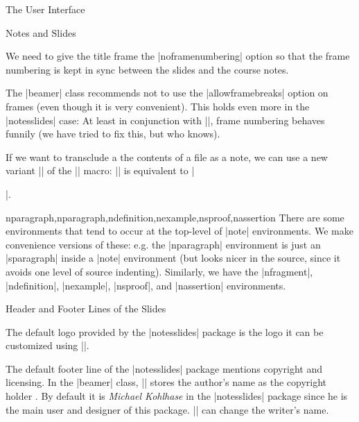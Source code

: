 \begin{sfragment}[id=sec:user]{The User Interface}
\begin{sfragment}[id=sec:user:notesslides]{Notes and Slides}
\begin{dangerbox}
  We need to give the title frame the |noframenumbering| option so that the frame
  numbering is kept in sync between the slides and the course notes.
\end{dangerbox}

\begin{dangerbox}
  The |beamer| class recommends not to use the |allowframebreaks| option on frames (even
  though it is very convenient). This holds even more in the |notesslides| case: At least
  in conjunction with |\newpage|, frame numbering behaves funnily (we have tried to fix
  this, but who knows).
\end{dangerbox}

\begin{function}{}
  If we want to transclude a the contents of a file as a note, we can use a new variant
  || of the || macro: || is equivalent to
  |\begin{note}\end{note}|.
\end{function}

\begin{environment}{nparagraph,nparagraph,ndefinition,nexample,nsproof,nassertion}
  There are some environments that tend to occur at the top-level of |note|
  environments. We make convenience versions of these: e.g. the |nparagraph| environment
  is just an |sparagraph| inside a |note| environment (but looks nicer in the source,
  since it avoids one level of source indenting). Similarly, we have the |nfragment|,
  |ndefinition|, |nexample|, |nsproof|, and |nassertion| environments.
\end{environment}
\end{sfragment}

\begin{sfragment}[id=sec:user:headfootlines]{Header and Footer Lines of the Slides}

\begin{function} {\setslidelogo}
  The default logo provided by the |notesslides| package is the {\sTeX} logo it can be
  customized using ||.
\end{function}

\begin{function}{\setsource}
  The default footer line of the |notesslides| package mentions copyright and
  licensing. In the |beamer| class, |\source| stores the author's name as the copyright
  holder . By default it is {\it Michael Kohlhase} in the |notesslides| package since he
  is the main user and designer of this package. || can change
  the writer's name.
\end{function}


\end{sfragment}
\end{sfragment}
